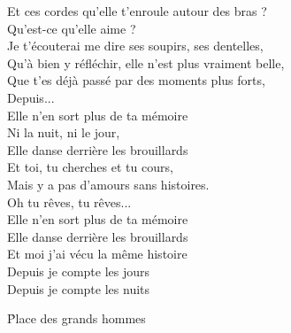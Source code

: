 \documentclass{novel}
\begin{document}
\begin{multicols}{2}
Et ces cordes qu'elle t'enroule autour des bras ? \\
Qu'est-ce qu'elle aime ? \\
Je t'écouterai me dire ses soupirs, ses dentelles, \\
Qu'à bien y réfléchir, elle n'est plus vraiment belle, \\
Que t'es déjà passé par des moments plus forts, \\
Depuis... \\
Elle n'en sort plus de ta mémoire \\
Ni la nuit, ni le jour, \\
Elle danse derrière les brouillards \\
Et toi, tu cherches et tu cours, \\
Mais y a pas d'amours sans histoires. \\
Oh tu rêves, tu rêves... \\
Elle n'en sort plus de ta mémoire \\
Elle danse derrière les brouillards \\
Et moi j'ai vécu la même histoire \\
Depuis je compte les jours \\
Depuis je compte les nuits
\end{multicols}

\newpage
\footnotesize

\h*{Place des grands hommes}
\end{document}
